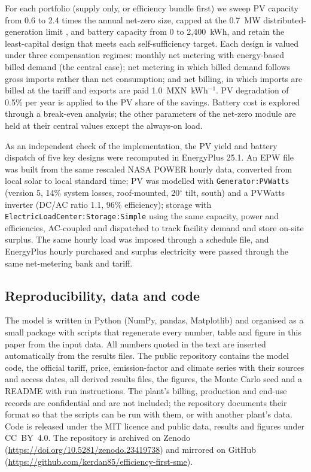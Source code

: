 \documentclass[preprint,12pt,authoryear]{elsarticle}
\newcommand{\MXN}{MXN}
\begin{document}
For each portfolio (supply only, or efficiency bundle first) we sweep PV capacity from 0.6 to 2.4 times the annual net-zero size, capped at the 0.7~MW distributed-generation limit \citep{lse2025}, and battery capacity from 0 to 2,400~kWh, and retain the least-capital design that meets each self-sufficiency target. Each design is valued under three compensation regimes: monthly net metering with energy-based billed demand (the central case); net metering in which billed demand follows gross imports rather than net consumption; and net billing, in which imports are billed at the tariff and exports are paid 1.0~\MXN~kWh$^{-1}$. PV degradation of 0.5\% per year is applied to the PV share of the savings. Battery cost is explored through a break-even analysis; the other parameters of the net-zero module are held at their central values except the always-on load.

As an independent check of the implementation, the PV yield and battery dispatch of five key designs were recomputed in EnergyPlus 25.1. An EPW file was built from the same rescaled NASA POWER hourly data, converted from local solar to local standard time; PV was modelled with \texttt{Generator:PVWatts} (version 5, 14\% system losses, roof-mounted, 20$^\circ$ tilt, south) and a PVWatts inverter (DC/AC ratio 1.1, 96\% efficiency); storage with \texttt{ElectricLoadCenter:Storage:Simple} using the same capacity, power and efficiencies, AC-coupled and dispatched to track facility demand and store on-site surplus. The same hourly load was imposed through a schedule file, and EnergyPlus hourly purchased and surplus electricity were passed through the same net-metering bank and tariff.

\subsection{Reproducibility, data and code}
\label{sec:repro}
The model is written in Python (NumPy, pandas, Matplotlib) and organised as a small package with scripts that regenerate every number, table and figure in this paper from the input data. All numbers quoted in the text are inserted automatically from the results files. The public repository contains the model code, the official tariff, price, emission-factor and climate series with their sources and access dates, all derived results files, the figures, the Monte Carlo seed and a README with run instructions. The plant's billing, production and end-use records are confidential and are not included; the repository documents their format so that the scripts can be run with them, or with another plant's data. Code is released under the MIT licence and public data, results and figures under CC~BY~4.0. The repository is archived on Zenodo (\url{https://doi.org/10.5281/zenodo.23419738}) and mirrored on GitHub (\url{https://github.com/kerdan85/efficiency-first-sme}).
\end{document}
